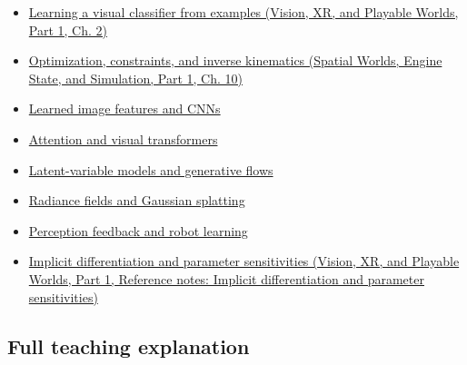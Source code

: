 \hypertarget{appendix-40df0855b4a7-used-by}{}

\begin{itemize}
\tightlist
\item
  \href{../07-Vision-XR-and-Playable-Worlds-P01/main.pdf\#04-visual-computing-ii-ch031-learning-a-visual-classifier-from-examples}{Learning a visual classifier from examples (Vision, XR, and Playable Worlds, Part 1, Ch. 2)}
\item
  \href{../05-Spatial-Worlds-Engine-State-and-Simulation-P01/main.pdf\#04-visual-computing-ii-ch029-optimization-constraints-and-inverse-kinematics}{Optimization, constraints, and inverse kinematics (Spatial Worlds, Engine State, and Simulation, Part 1, Ch. 10)}
\item
  \hyperref[appendix-47c51ea026fb]{Learned image features and CNNs}
\item
  \hyperref[appendix-a9d5dfdd164a]{Attention and visual transformers}
\item
  \hyperref[appendix-2c568f05ee34]{Latent-variable models and generative flows}
\item
  \hyperref[appendix-c5b332e400e7]{Radiance fields and Gaussian splatting}
\item
  \hyperref[appendix-b0c42da325f1]{Perception feedback and robot learning}
\item
  \href{../07-Vision-XR-and-Playable-Worlds-P01/main.pdf\#appendix-8836553d56fc}{Implicit differentiation and parameter sensitivities (Vision, XR, and Playable Worlds, Part 1, Reference notes: Implicit differentiation and parameter sensitivities)}
\end{itemize}

\subsection{Full teaching explanation}\label{appendix-40df0855b4a7-full-teaching-explanation}

\hypertarget{appendix-40df0855b4a7-full-teaching-explanation}{}

